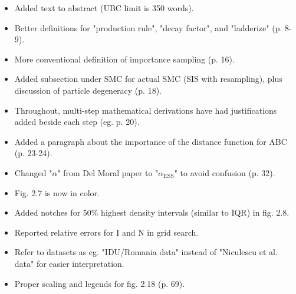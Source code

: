 \documentclass[11pt]{article}
\begin{document}
\begin{itemize}
  \item Added text to abstract (UBC limit is 350 words).
  \item Better definitions for "production rule", "decay factor", and
    "ladderize" (p. 8-9).
  \item More conventional definition of importance sampling (p. 16).\
  \item Added subsection under SMC for actual SMC (SIS with resampling), plus
    discussion of particle degeneracy (p. 18).
  \item Throughout, multi-step mathematical derivations have had justifications
    added beside each step (eg. p. 20).
  \item Added a paragraph about the importance of the distance function for ABC
    (p. 23-24).
  \item Changed "$\alpha$" from Del Moral paper to "$\alpha_{\text{ESS}}$" to avoid
    confusion (p. 32).
  \item Fig. 2.7 is now in color.
  \item Added notches for 50\% highest density intervals (similar to IQR) in
    fig. 2.8.
  \item Reported relative errors for I and N in grid search.
  \item Refer to datasets as eg. "IDU/Romania data" instead of "Niculescu et
    al. data" for easier interpretation.
  \item Proper scaling and legends for fig. 2.18 (p. 69).
\end{itemize}
\end{document}
